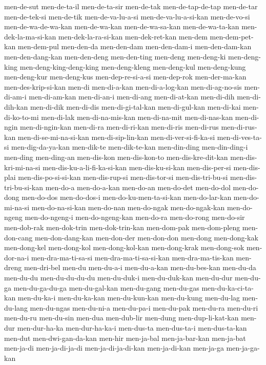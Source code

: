 {men-de-sut men-de-ta-il men-de-ta-sir men-de-tak men-de-tap-de-tap
men-de-tar men-de-tek-si men-de-tik men-de-va-lu-a-si
men-de-va-lu-a-si-kan men-de-vo-si men-de-wa-de-wa-kan men-de-wa-kan
men-de-wa-sa-kan men-de-wa-ta-kan men-dek-la-ma-si-kan
men-dek-la-ra-si-kan men-dek-ret-kan men-dem men-dem-pet-kan men-dem-pul
men-den-da men-den-dam men-den-dam-i men-den-dam-kan men-den-dang-kan
men-den-deng men-den-ting men-deng men-deng-ki men-deng-king
men-deng-king-deng-king men-deng-kleng men-deng-kul men-deng-kung
men-deng-kur men-deng-kus men-dep-re-si-a-si men-dep-rok men-der-ma-kan
men-des-krip-si-kan men-di men-di-a-kan men-di-a-log-kan men-di-ag-no-sis
men-di-am-i men-di-am-kan men-di-an-i men-di-ang men-di-at-kan men-di-dih
men-di-dih-kan men-di-dik men-di-dis men-di-gi-tal-kan men-di-gul-kan
men-di-kai men-di-ko-to-mi men-di-lak men-di-na-mis-kan men-di-na-mit
men-di-nas-kan men-di-ngin men-di-ngin-kan men-di-ra men-di-ri-kan
men-di-ris men-di-rus men-di-rus-kan men-di-se-mi-na-si-kan
men-di-sip-lin-kan men-di-ver-si-fi-ka-si men-di-ves-ta-si
men-dig-da-ya-kan men-dik-te men-dik-te-kan men-din-ding men-din-ding-i
men-ding men-ding-an men-dis-kon men-dis-kon-to men-dis-kre-dit-kan
men-dis-kri-mi-na-si men-dis-ku-a-li-fi-ka-si-kan men-dis-ku-si-kan
men-dis-per-si men-dis-plai men-dis-po-si-si-kan men-dis-rup-si
men-dis-tor-si men-dis-tri-bu-si men-dis-tri-bu-si-kan men-do-a
men-do-a-kan men-do-an men-do-det men-do-dol men-do-dong men-do-dos
men-do-dos-i men-do-ku-men-ta-si-kan men-do-lar-kan men-do-mi-na-si
men-do-na-si-kan men-do-nan men-do-ngak men-do-ngak-kan men-do-ngeng
men-do-ngeng-i men-do-ngeng-kan men-do-ra men-do-rong men-do-sir
men-dob-rak men-dok-trin men-dok-trin-kan men-dom-pak men-dom-pleng
men-don-cang men-don-dang-kan men-don-der men-don-don men-dong
men-dong-kak men-dong-kel men-dong-kol men-dong-kol-kan men-dong-krak
men-dong-sok men-dor-na-i men-dra-ma-ti-sa-si men-dra-ma-ti-sa-si-kan
men-dra-ma-tis-kan men-dreng men-dri-bel men-du men-du-a-i men-du-a-kan
men-du-bes-kan men-du-da men-du-du men-du-du-du-du men-du-duk-i
men-du-duk-kan men-du-dur men-du-ga men-du-ga-du-ga men-du-gal-kan
men-du-gang men-du-gas men-du-ka-ci-ta-kan men-du-ka-i men-du-ka-kan
men-du-kun-kan men-du-kung men-du-lag men-du-lang men-du-ngas men-du-ni-a
men-du-pa-i men-du-pak men-du-ra men-du-ri men-du-ru men-du-sin men-dua
men-dub-lir men-dung men-dup-li-kat-kan men-dur men-dur-ha-ka
men-dur-ha-ka-i men-dus-ta men-dus-ta-i men-dus-ta-kan men-dut
men-dwi-gan-da-kan men-hir men-ja-bal men-ja-bar-kan men-ja-bat men-ja-di
men-ja-di-ja-di men-ja-di-ja-di-kan men-ja-di-kan men-ja-ga men-ja-ga-kan
}
